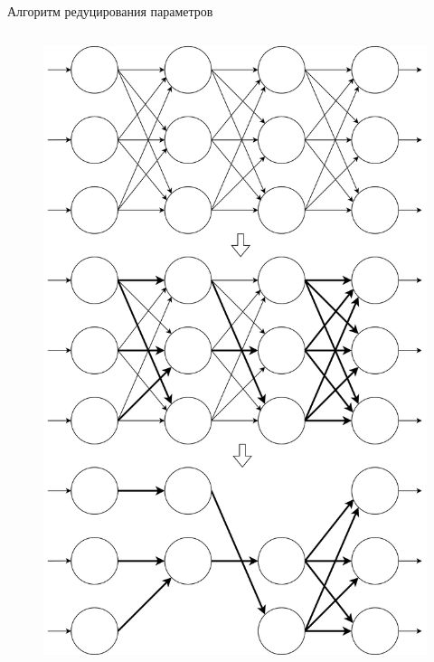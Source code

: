 \documentclass[10pt]{beamer}
\begin{document}
\begin{frame}{Алгоритм редуцирования параметров}
\begin{columns}
\begin{column}{0.4\textwidth}
\begin{figure}[H]
                    \includegraphics[width=01\textwidth]{pic2-3.png}
                \end{figure}
            \end{column}
        \end{columns}
        \end{frame}
\end{document}
